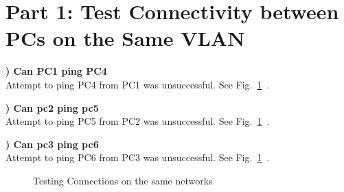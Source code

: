 \documentclass{report}
\title{\classinfo}
\author{\semester}
\date{\today}
\newcommand{\mysection}[1]{\section*{#1}}
\newcommand{\mysubsection}[2]{\textbf{\romannumeral #1) #2}}
\begin{document}
\maketitle

\mysection{\textbf{Part 1: Test Connectivity between PCs on the Same VLAN}}

\mysubsection{1}{Can PC1 ping PC4}
\\Attempt to ping PC4 from PC1 was unsuccessful. See
Fig.~\ref{Ping11}~. 

\noindent\mysubsection{2}{Can pc2 ping pc5}
\\Attempt to ping PC5 from PC2 was unsuccessful. See
Fig.~\ref{Ping11}~. 

\noindent\mysubsection{3}{Can pc3 ping pc6}
\\Attempt to ping PC6 from PC3 was unsuccessful. See
Fig.~\ref{Ping11}~. 


\begin{figure}[!hbt]\centering
{}\par
{}\hfill
{}\par
\caption{Testing Connections on the same networks}
\label{Ping11}
\end{figure}
\end{document}

